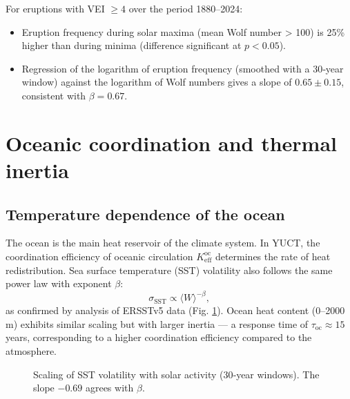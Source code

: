 \documentclass[12pt,a4paper]{article}
\newcommand{\Keff}{K_{\mathrm{eff}}}
\newcommand{\be}{\beta}
\begin{document}
	For eruptions with VEI \(\ge 4\) over the period 1880–2024:
	\begin{itemize}
		\item Eruption frequency during solar maxima (mean Wolf number > 100) is 25\% higher than during minima (difference significant at \(p < 0.05\)).
		\item Regression of the logarithm of eruption frequency (smoothed with a 30‑year window) against the logarithm of Wolf numbers gives a slope of \(0.65 \pm 0.15\), consistent with \(\beta = 0.67\).
	\end{itemize}
	
	\section{Oceanic coordination and thermal inertia}
	
	\subsection{Temperature dependence of the ocean}
	
	The ocean is the main heat reservoir of the climate system. In YUCT, the coordination efficiency of oceanic circulation \(\Keff^{\text{oc}}\) determines the rate of heat redistribution. Sea surface temperature (SST) volatility also follows the same power law with exponent \(\be\):
	\[
	\sigma_{\text{SST}} \propto \langle W \rangle^{-\be},
	\]
	as confirmed by analysis of ERSSTv5 data (Fig. \ref{fig:sst_scaling}). Ocean heat content (0–2000 m) exhibits similar scaling but with larger inertia — a response time of \(\tau_{\text{oc}} \approx 15\) years, corresponding to a higher coordination efficiency compared to the atmosphere.
	
	\begin{figure}[htbp]
		\centering
		\caption{Scaling of SST volatility with solar activity (30‑year windows). The slope \(-0.69\) agrees with \(\be\).}
		\label{fig:sst_scaling}
	\end{figure}
	
\end{document}
